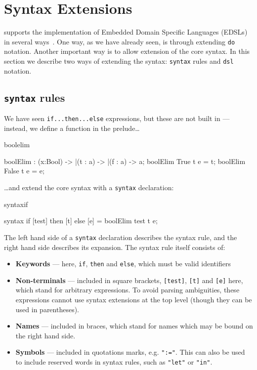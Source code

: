 \section{Syntax Extensions}

\Idris{} supports the implementation of Embedded Domain Specific Languages (EDSLs) in
several ways~\cite{res-dsl-padl12}. One way, as we have already seen, is through
extending \texttt{do} notation. Another important way is to allow extension of the core
syntax. In this section we describe two ways of extending the syntax: \texttt{syntax}
rules and \texttt{dsl} notation.

\subsection{\texttt{syntax} rules}

We have seen \texttt{if...then...else} expressions, but these
are not built in --- instead, we define a function in the prelude\ldots

\begin{SaveVerbatim}{boolelim}

boolElim : (x:Bool) -> |(t : a) -> |(f : a) -> a; 
boolElim True  t e = t;
boolElim False t e = e;

\end{SaveVerbatim}

\noindent
\ldots and extend the core syntax with a \texttt{syntax} declaration:

\begin{SaveVerbatim}{syntaxif}

syntax if [test] then [t] else [e] = boolElim test t e;

\end{SaveVerbatim}

\noindent
The left hand side of a \texttt{syntax} declaration describes the syntax rule, and the right
hand side describes its expansion. The syntax rule itself consists of:

\begin{itemize}
\item \textbf{Keywords} --- here, \texttt{if}, \texttt{then} and \texttt{else}, which must
be valid identifiers
\item \textbf{Non-terminals} --- included in square brackets, \texttt{[test]}, \texttt{[t]}
and \texttt{[e]} here, which stand for arbitrary expressions. To avoid parsing ambiguities, 
these expressions cannot use syntax extensions at the top level (though they can be used
in parentheses).
\item \textbf{Names} --- included in braces, which stand for names which may be bound
on the right hand side.
\item \textbf{Symbols} --- included in quotations marks, e.g. \texttt{":="}. This can
also be used to include reserved words in syntax rules, such as \texttt{"let"} or \texttt{"in"}.
\end{itemize}

